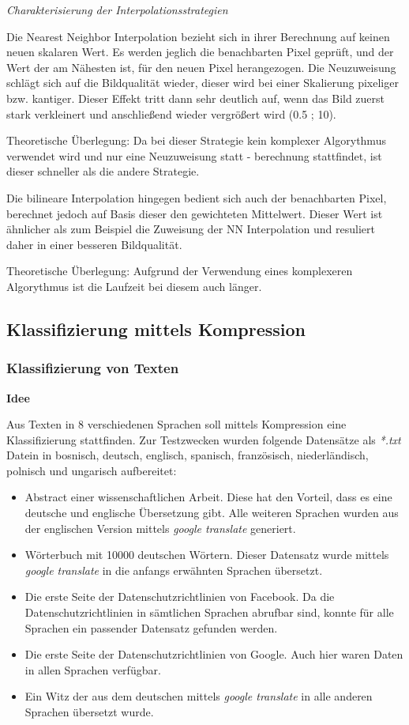 \documentclass[12pt,german]{article}
\begin{document}
\textit{Charakterisierung der Interpolationsstrategien}

Die Nearest Neighbor Interpolation bezieht sich in ihrer Berechnung auf keinen neuen skalaren Wert. Es werden jeglich die benachbarten Pixel geprüft, und der Wert der am Nähesten ist, für den neuen Pixel herangezogen. Die Neuzuweisung schlägt sich auf die Bildqualität wieder, dieser wird bei einer Skalierung pixeliger bzw. kantiger. Dieser Effekt tritt dann sehr deutlich auf, wenn das Bild zuerst stark verkleinert und anschließend wieder vergrößert wird (0.5 ; 10).

Theoretische Überlegung: Da bei dieser Strategie kein komplexer Algorythmus verwendet wird und nur eine Neuzuweisung statt - berechnung stattfindet, ist dieser schneller als die andere Strategie.

Die bilineare Interpolation hingegen bedient sich auch der benachbarten Pixel, berechnet jedoch auf Basis dieser den gewichteten Mittelwert. Dieser Wert ist ähnlicher als zum Beispiel die Zuweisung der NN Interpolation und resuliert daher in einer besseren Bildqualität. 

Theoretische Überlegung: Aufgrund der Verwendung eines komplexeren Algorythmus ist die Laufzeit bei diesem auch länger.

 \subsection{Klassifizierung mittels Kompression}
\subsubsection{Klassifizierung von Texten}

\textbf{Idee}

Aus Texten in 8 verschiedenen Sprachen soll mittels Kompression eine Klassifizierung stattfinden. Zur Testzwecken wurden folgende Datensätze als \textit{ *.txt}  Datein in bosnisch, deutsch, englisch, spanisch, französisch, niederländisch, polnisch und ungarisch aufbereitet:

\begin{itemize}
	\item Abstract einer wissenschaftlichen Arbeit. Diese hat den Vorteil, dass es eine deutsche und englische Übersetzung gibt. Alle weiteren Sprachen wurden aus der englischen Version mittels \textit{google translate} generiert.
	\item Wörterbuch mit 10000 deutschen Wörtern. Dieser Datensatz wurde mittels \textit{google translate} in die anfangs erwähnten Sprachen übersetzt.
	\item Die erste Seite der Datenschutzrichtlinien von Facebook. Da die Datenschutzrichtlinien in sämtlichen Sprachen abrufbar sind, konnte für alle Sprachen ein passender Datensatz gefunden werden.
	\item Die erste Seite der Datenschutzrichtlinien von Google. Auch hier waren Daten in allen Sprachen verfügbar.
	\item Ein Witz der aus dem deutschen mittels \textit{google translate} in alle anderen Sprachen übersetzt wurde.
\end{itemize}
\end{document}
